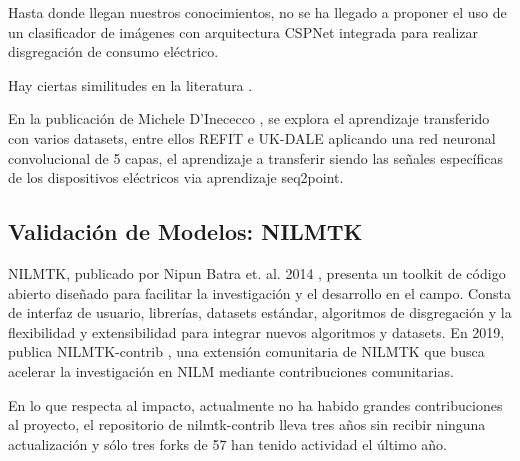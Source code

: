 Hasta donde llegan nuestros conocimientos, no se ha llegado a proponer el uso de un clasificador de imágenes con arquitectura CSPNet integrada para realizar disgregación de consumo eléctrico. 

Hay ciertas similitudes en la literatura \autocite{Radoslav2023}. 
\autocite{Xia2019}

En la publicación de Michele D'Inececco \autocite{Inecco2019}, se explora el aprendizaje transferido con varios datasets, entre ellos REFIT e UK-DALE aplicando una red neuronal convolucional de 5 capas, el aprendizaje a transferir siendo las señales específicas de los dispositivos eléctricos via aprendizaje seq2point.

\subsection{Validación de Modelos: NILMTK}  
NILMTK, publicado por Nipun Batra et. al. 2014 \autocite{Nipun2014}, presenta un toolkit de código abierto diseñado para facilitar la investigación y el desarrollo en el campo. Consta de interfaz de usuario, librerías, datasets estándar, algoritmos de disgregación y la flexibilidad y extensibilidad para integrar nuevos algoritmos y datasets. 
En 2019, publica NILMTK-contrib \autocite{Nipun2019}, una extensión comunitaria de NILMTK que busca acelerar la investigación en NILM mediante contribuciones comunitarias. 

\newpage
En lo que respecta al impacto, actualmente no ha habido grandes contribuciones al proyecto, el repositorio de nilmtk-contrib lleva tres años sin recibir ninguna actualización y sólo tres forks de 57 han tenido actividad el último año.

